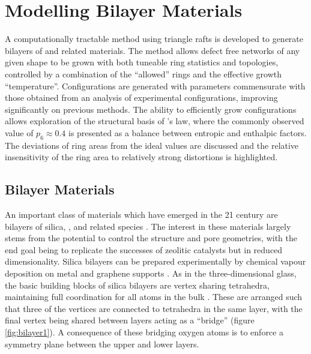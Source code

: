 \chapter[Modelling Bilayer Materials]{Modelling Bilayer Materials}
\label{ch:bilayers}

\begin{chapterabstract}
A computationally tractable \mc{} method using triangle rafts is developed to generate bilayers of \sioii{} and related materials.
The method allows defect free networks of any given shape to be grown with both tuneable ring statistics and topologies, controlled by a combination of the ``allowed'' rings and the effective growth ``temperature''. 
Configurations are generated with \aw{} parameters commensurate with those obtained from an analysis of experimental configurations, improving significantly on previous methods.
The ability to efficiently grow configurations allows exploration of the structural basis of \lm’s law, where the commonly observed value of $p_6\approx0.4$ is presented as a balance between entropic and enthalpic factors. 
The deviations of ring areas from the ideal values are discussed and the relative insensitivity of the ring area to relatively strong distortions is highlighted.
\end{chapterabstract}

\section{Bilayer Materials}

An important class of \td{} materials which have emerged in the 21\st{} century are bilayers of silica, \sioii, and related species \cite{Buchner2017}.
The interest in these materials largely stems from the potential to control the structure and pore geometries, with the end goal being to replicate the successes of zeolitic catalysts but in reduced dimensionality. 
Silica bilayers can be prepared experimentally by chemical vapour deposition on metal and graphene supports \cite{Huang2012,Lichtenstein2012a}.
As in the three\--dimensional glass, the basic building blocks of silica bilayers are vertex sharing \sioiv{} tetrahedra, maintaining full coordination for all atoms in the bulk \cite{Wilson2013}.
These are arranged such that three of the vertices are connected to tetrahedra in the same layer, with the final vertex being shared between layers acting as a ``bridge'' (figure \ref{fig:bilayer1}).
A consequence of these bridging oxygen atoms is to enforce a symmetry plane between the upper and lower layers.

